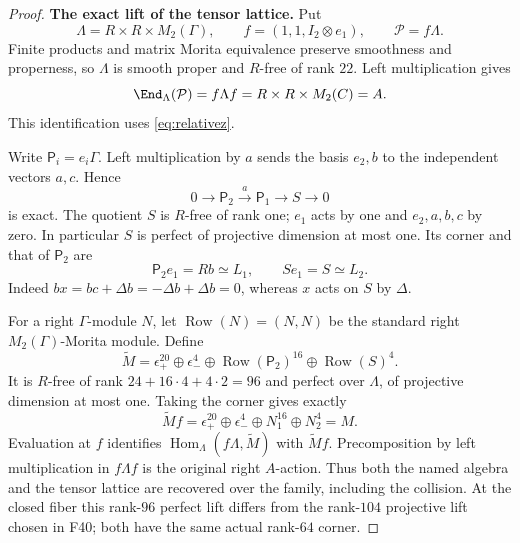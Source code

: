 \documentclass[11pt,a4paper]{article}
\newcommand{\fid}[1]{\textsf{#1}}\newcommand{\gate}[1]{\textsf{#1}}
\theoremstyle{named}\newtheorem{finding}{Finding}[section]
\theoremstyle{definition}\newtheorem{definition}[finding]{Definition}
\theoremstyle{remark}\newtheorem{remark}[finding]{Remark}
\begin{document}
\begin{proof}
\par\smallskip\noindent\textbf{The exact lift of the tensor lattice.}\quad
Put
\[
 \Lambda=R\times R\times M_2(\Gamma),\qquad
 f=(1,1,I_2\otimes e_1),\qquad \mathcal P=f\Lambda.
\]
Finite products and matrix Morita equivalence preserve
smoothness and properness, so $\Lambda$ is smooth proper
and $R$-free of rank $22$. Left multiplication gives
\[
 \End_\Lambda(\mathcal P)=f\Lambda f
       =R\times R\times M_2(C)=A.
\]
This identification uses \eqref{eq:relativez}.

Write $\mathsf P_i=e_i\Gamma$. Left multiplication by
$a$ sends the basis $e_2,b$ to the independent vectors
$a,c$. Hence
\begin{equation}\label{eq:relativeS}
 0\longrightarrow\mathsf P_2\xrightarrow{a}\mathsf P_1
      \longrightarrow S\longrightarrow0
\end{equation}
is exact. The quotient $S$ is $R$-free of rank one;
$e_1$ acts by one and $e_2,a,b,c$ by zero.
In particular $S$ is perfect of projective dimension at
most one. Its corner and that of $\mathsf P_2$ are
\[
 \mathsf P_2e_1=Rb\simeq L_1,\qquad Se_1=S\simeq L_2.
\]
Indeed $bx=bc+\Delta b=-\Delta b+\Delta b=0$,
whereas $x$ acts on $S$ by $\Delta$.

For a right $\Gamma$-module $N$, let
$\operatorname{Row}(N)=(N,N)$ be the standard right
$M_2(\Gamma)$-Morita module. Define
\begin{equation}\label{eq:relativelift}
 \widetilde M=\epsilon_+^{20}\oplus\epsilon_-^4
       \oplus\operatorname{Row}(\mathsf P_2)^{16}
       \oplus\operatorname{Row}(S)^4.
\end{equation}
It is $R$-free of rank $24+16\cdot4+4\cdot2=96$
and perfect over $\Lambda$, of projective dimension
at most one. Taking the corner gives exactly
\[
 \widetilde M f=
 \epsilon_+^{20}\oplus\epsilon_-^4\oplus N_1^{16}
       \oplus N_2^4=M.
\]
Evaluation at $f$ identifies
$\operatorname{Hom}_\Lambda(f\Lambda,\widetilde M)$
with $\widetilde M f$. Precomposition by left multiplication
in $f\Lambda f$ is the original right $A$-action.
Thus both the named algebra and the tensor lattice are
recovered over the family, including the collision.
At the closed fiber this rank-$96$ perfect lift differs
from the rank-$104$ projective lift chosen in \fid{F40};
both have the same actual rank-$64$ corner.


\end{proof}
\end{document}
